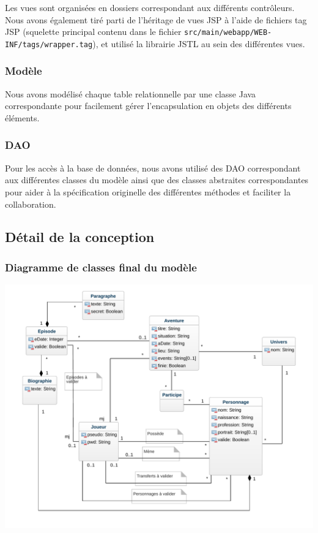 \documentclass[a4paper, 11pt, titlepage]{article}
\begin{document}
Les vues sont organisées en dossiers correspondant aux différents contrôleurs. Nous avons également tiré parti de l'héritage de vues JSP à l'aide de fichiers tag JSP (squelette principal contenu dans le fichier \lstinline!src/main/webapp/WEB-INF/tags/wrapper.tag!), et utilisé la librairie JSTL au sein des différentes vues.


\subsubsection {Modèle}

Nous avons modélisé chaque table relationnelle par une classe Java correspondante pour facilement gérer l'encapsulation en objets des différents éléments.


\subsubsection {DAO}

Pour les accès à la base de données, nous avons utilisé des DAO correspondant aux différentes classes du modèle ainsi que des classes abstraites correspondantes pour aider à la spécification originelle des différentes méthodes et faciliter la collaboration.



\subsection {Détail de la conception}

\subsubsection {Diagramme de classes final du modèle}

\begin{center}
\includegraphics[scale=0.7]{conception/classes.pdf}
\end{center}
\end{document}
